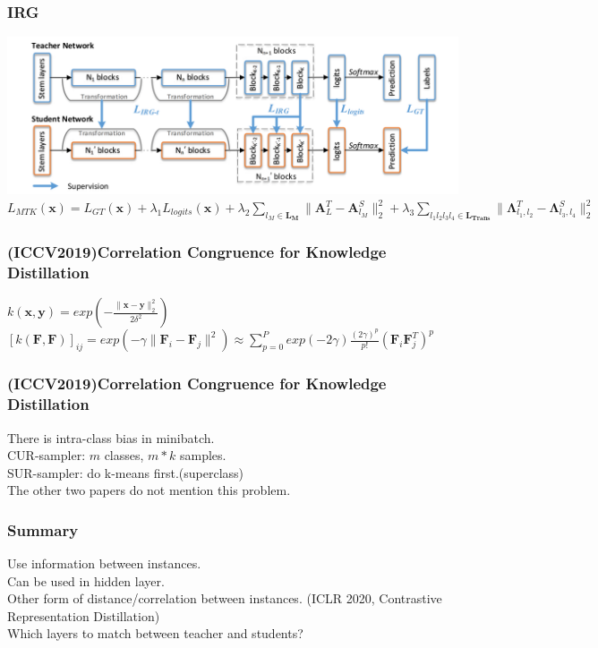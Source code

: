 \documentclass{beamer}
\begin{document}
\begin{frame}
    \frametitle{IRG}
    \includegraphics[width=1.0\textwidth]{irg.png}
    $L_{MTK}(\bm x)=L_{GT}(\bm x)+\lambda_1L_{logits}(\bm x) + \lambda_2\sum\limits_{l_M\in \bm{L_M}}\|\bm A_L^T-\bm A_{l_M}^S\|_2^2+\lambda_3\sum\limits_{l_1l_2l_3l_4\in \bm{L_{Trans}}}{\|\bm \Lambda_{l_1,l_2}^T-\bm \Lambda_{l_3,l_4}^S\|_2^2}$ \\
\end{frame}

\begin{frame}
    \frametitle{(ICCV2019)Correlation Congruence for Knowledge Distillation}
    $k(\bm x, \bm y)=exp(-\frac{\|\bm x-\bm y\|_2^2}{2\delta^2})$\\
    $[k(\bm F, \bm F)]_{ij}=exp(-\gamma\|\bm F_i-\bm F_j\|^2) \approx \sum_{p=0}^P{exp(-2\gamma)\frac{(2\gamma)^p}{p!}(\bm F_i \bm F_j^T)^p}$
\end{frame}

\begin{frame}
    \frametitle{(ICCV2019)Correlation Congruence for Knowledge Distillation}
    There is intra-class bias in minibatch.\\
    CUR-sampler: $m$ classes, $m*k$ samples.\\
    SUR-sampler: do k-means first.(superclass)\\
    \vspace{8mm}
    The other two papers do not mention this problem.
\end{frame}

\begin{frame}
    \frametitle{Summary}
    Use information between instances. \\
    Can be used in hidden layer. \\
    \vspace{8mm}
    Other form of distance/correlation between instances. (ICLR 2020, Contrastive Representation Distillation) \\
    Which layers to match between teacher and students?
\end{frame}
\end{document}
